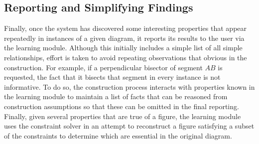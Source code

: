 \subsection{Reporting and Simplifying Findings}

Finally, once the system has discovered some interesting properties
that appear repeatedly in instances of a given diagram, it reports its
results to the user via the learning module.  Although this initially
includes a simple list of all simple relationships, effort is taken to
avoid repeating observations that obvious in the construction.  For
example, if a perpendicular bisector of segment $AB$ is requested, the
fact that it bisects that segment in every instance is not
informative.  To do so, the construction process interacts with
properties known in the learning module to maintain a list of facts
that can be reasoned from construction assumptions so that these can
be omitted in the final reporting. Finally, given several properties
that are true of a figure, the learning module uses the constraint
solver in an attempt to reconstruct a figure satisfying a subset of
the constraints to determine which are essential in the original
diagram.

